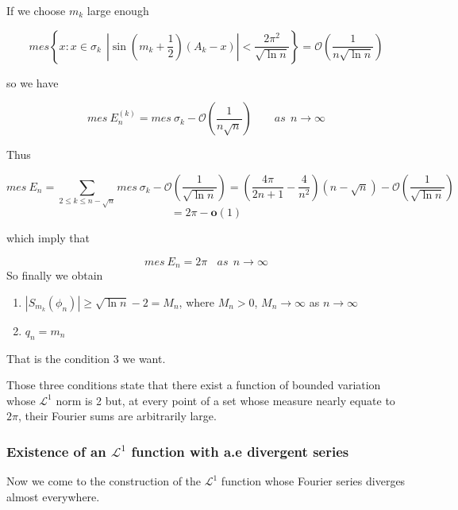 \documentclass{article}
\begin{document}
If we choose $ m_k $ large enough 

\[  mes\left\{x: x \in \sigma_k \ \  |\sin(m_k +\frac{1}{2})(A_k-x)| < \frac{2\pi^2}{\sqrt{\ln n}}\right\}=\mathcal{O}(\frac{1}{n\sqrt{\ln n}})\]

so we have 

\[ mes\  E_n^{(k)} = mes \ \sigma_k- \mathcal{O}(\frac{1}{n\sqrt{n}}) \quad \quad as \ \ n \rightarrow \infty\]

Thus 

\[ mes\ E_n= \sum_{2 \leqslant k \leqslant n- \sqrt{n}}mes\ \sigma_k- \mathcal{O}(\frac{1}{\sqrt{\ln n}})  = (\frac{4\pi}{2n+1}-\frac{4}{n^2})(n-\sqrt{n})-\mathcal{O}(\frac{1}{\sqrt{\ln n}})\]
\[ = 2\pi - \mathbf{o} (1) \]

which imply that 

\[ mes \ E_n=2\pi \ \ \ \ as \  \ n \rightarrow \infty \]
So finally we obtain 
\begin{enumerate}
    \item $ | S_{m_k}(\phi_n)| \geqslant \sqrt{\ln n } -2 = M_n$,  where $ M_n >0 $, $ M_n \rightarrow \infty $ as $ n \rightarrow \infty $
    \item $q_n=m_n$
\end{enumerate}

That is the condition 3 we want.\par
Those three conditions state that there exist a function of bounded variation whose $ \mathcal{L}^1  $ norm is 2 but, at every point of a set whose measure nearly equate to $ 2\pi $, their Fourier sums are arbitrarily large.\par



\subsubsection*{Existence of an $ \mathcal{L}^1  $  function with a.e divergent series}
Now we come to the construction of the $ \mathcal{L}^1 $ function whose Fourier series diverges almost everywhere.

\end{document}

